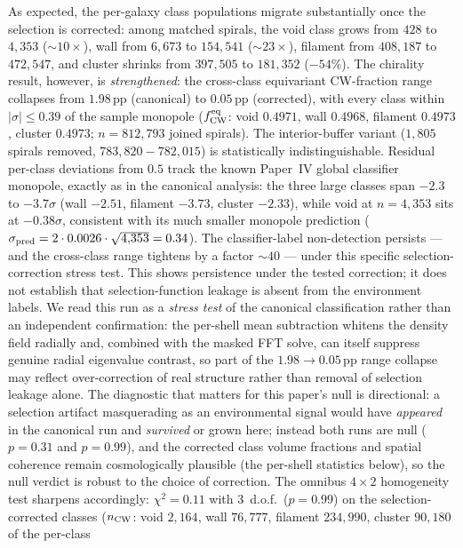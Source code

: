 \documentclass[aps,prd,twocolumn,superscriptaddress,showpacs,preprintnumbers,nofootinbib,longbibliography,floatfix]{revtex4-2}
\begin{document}
As expected, the per-galaxy class populations migrate substantially
once the selection is corrected: among matched spirals, the void class
grows from $428$ to $4{,}353$ ($\sim\!10\times$), wall from $6{,}673$
to $154{,}541$ ($\sim\!23\times$), filament from $408{,}187$ to
$472{,}547$, and cluster shrinks from $397{,}505$ to $181{,}352$
($-54\%$). The chirality result, however, is \emph{strengthened}: the
cross-class equivariant CW-fraction range collapses from
$1.98$\,pp (canonical) to $0.05$\,pp (corrected), with every class
within $|\sigma| \le 0.39$ of the sample monopole
($f_{\rm CW}^{\rm eq}$: void $0.4971$, wall $0.4968$, filament
$0.4973$, cluster $0.4973$; $n = 812{,}793$ joined spirals). The
interior-buffer variant ($1{,}805$ spirals removed, $783{,}820-782{,}015$)
is statistically indistinguishable. Residual per-class deviations from $0.5$ track the
known Paper~IV global classifier monopole, exactly as in the
canonical analysis: the three large classes span $-2.3$ to
$-3.7\sigma$ (wall $-2.51$, filament $-3.73$, cluster $-2.33$), while
void at $n = 4{,}353$ sits at $-0.38\sigma$, consistent with its much
smaller monopole prediction
($\sigma_{\rm pred} = 2 \cdot 0.0026 \cdot \sqrt{4{,}353} = 0.34$). The
classifier-label non-detection persists --- and the cross-class range
tightens by a factor ${\sim}40$ --- under this specific
selection-correction stress test. This shows persistence under the tested
correction; it does not establish that selection-function leakage is absent
from the environment labels. We read this run as a \emph{stress test} of the
canonical classification rather than an independent confirmation: the
per-shell mean subtraction whitens the density field radially and,
combined with the masked FFT solve, can itself suppress genuine
radial eigenvalue contrast, so part of the $1.98 \to 0.05$\,pp range
collapse may reflect over-correction of real structure rather than
removal of selection leakage alone. The diagnostic that matters for
this paper's null is directional: a selection artifact masquerading
as an environmental signal would have \emph{appeared} in the
canonical run and \emph{survived} or grown here; instead both runs
are null ($p = 0.31$ and $p = 0.99$), and the corrected class volume
fractions and spatial coherence remain cosmologically plausible (the
per-shell statistics below), so the null verdict is robust to the choice
of correction. The omnibus $4\times2$ homogeneity test sharpens
accordingly: $\chi^2 = 0.11$ with 3~d.o.f.\ ($p = 0.99$) on the
selection-corrected classes ($n_{\rm CW}$: void $2{,}164$, wall
$76{,}777$, filament $234{,}990$, cluster $90{,}180$ of the per-class
\end{document}
